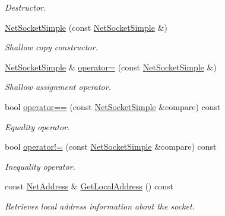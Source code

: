 \begin{DoxyCompactItemize}
\begin{DoxyCompactList}\small\item\em Destructor. \item\end{DoxyCompactList}\item 
\hyperlink{class_net_socket_simple_abf0dab7f59120c46b99d5ebd1b120790}{NetSocketSimple} (const \hyperlink{class_net_socket_simple}{NetSocketSimple} \&)
\begin{DoxyCompactList}\small\item\em Shallow copy constructor. \item\end{DoxyCompactList}\item 
\hyperlink{class_net_socket_simple}{NetSocketSimple} \& \hyperlink{class_net_socket_simple_afa1b2f2cd2015701d15b4d0428cde8be}{operator=} (const \hyperlink{class_net_socket_simple}{NetSocketSimple} \&)
\begin{DoxyCompactList}\small\item\em Shallow assignment operator. \item\end{DoxyCompactList}\item 
bool \hyperlink{class_net_socket_simple_a2b59ac8bb50a0481afe94ae628f8b2e7}{operator==} (const \hyperlink{class_net_socket_simple}{NetSocketSimple} \&compare) const 
\begin{DoxyCompactList}\small\item\em Equality operator. \item\end{DoxyCompactList}\item 
bool \hyperlink{class_net_socket_simple_a96543f144f440b39c3c7bf3415bd5f39}{operator!=} (const \hyperlink{class_net_socket_simple}{NetSocketSimple} \&compare) const 
\begin{DoxyCompactList}\small\item\em Inequality operator. \item\end{DoxyCompactList}\item 
const \hyperlink{class_net_address}{NetAddress} \& \hyperlink{class_net_socket_simple_abef9c4aaf143e251c4715c76f00d9b4f}{GetLocalAddress} () const 
\begin{DoxyCompactList}\small\item\em Retrieves local address information about the socket. \item\end{DoxyCompactList}\item 

\end{DoxyCompactItemize}
